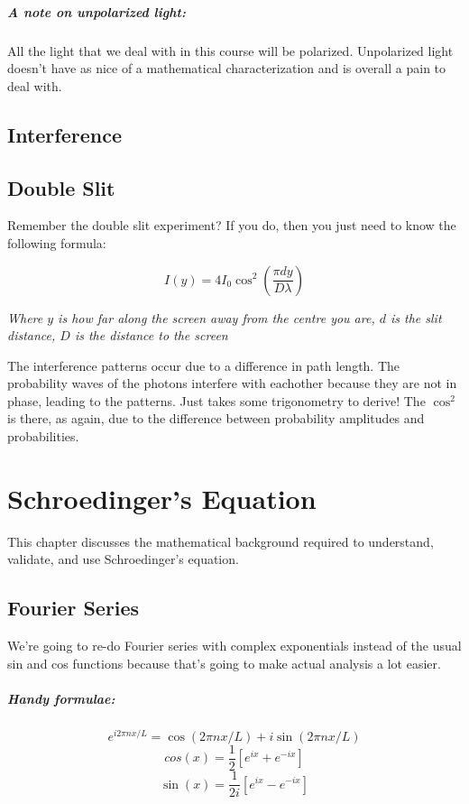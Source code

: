\documentclass[a4paper,12pt]{report}
\begin{document}
\paragraph{A note on unpolarized light: } All the light that we deal with in this course will be polarized. Unpolarized light doesn't have as nice of a mathematical characterization and is overall a pain to deal with.

\section{Interference}
\section{Double Slit}
Remember the double slit experiment? If you do, then you just need to know the following formula: 

$$I(y) = 4I_0 \cos^2(\frac{\pi d y}{D \lambda})$$

\textit{Where $y$ is how far along the screen away from the centre you are, $d$ is the slit distance, $D$ is the distance to the screen}

The interference patterns occur due to a difference in path length. The probability waves of the photons interfere with eachother because they are not in phase, leading to the patterns. Just takes some trigonometry to derive! The $\cos^2$ is there, as again, due to the difference between probability amplitudes and probabilities.

\chapter{Schroedinger's Equation}
This chapter discusses the mathematical background required to understand, validate, and use Schroedinger's equation.
\section{Fourier Series}

We're going to re-do Fourier series with complex exponentials instead of the usual sin and cos functions because that's going to make actual analysis a lot easier.
\paragraph{Handy formulae: }
$$e^{i2\pi n x/L} = \cos(2\pi n x / L) + i\sin(2\pi n x/L)$$
$$cos(x) = \frac{1}{2}[e^{ix} + e^{-ix}]$$
$$\sin(x) = \frac{1}{2i}[e^{ix} - e^{-ix}]$$
\end{document}
